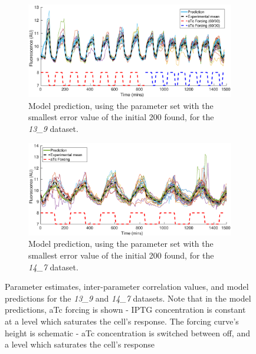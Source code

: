 \documentclass[10pt,journal]{./IEEE_latex_class/IEEEtran}
\begin{document}
\begin{figure}
    \begin{subfigure}[c]{0.49\textwidth}
    \centering
    \includegraphics[scale = 0.37]{13_9_bestPlot}
        \caption{Model prediction, using the parameter set with the smallest error value of the initial 200 found, for the \textit{13\_9} dataset.}
    \end{subfigure}
    \begin{subfigure}[c]{0.49\textwidth}
    \centering
        \includegraphics[scale = 0.37]{14_7_bestPlot}
        \caption{Model prediction, using the parameter set with the smallest error value of the initial 200 found, for the \textit{14\_7} dataset.}
    \end{subfigure}
    \caption{Parameter estimates, inter-parameter correlation values, and model predictions for the \textit{13\_9} and \textit{14\_7} datasets. Note that in the model predictions, aTc forcing is shown - IPTG concentration is constant at a level which saturates the cell's response. The forcing curve's height is schematic - aTc concentration is switched between off, and a level which saturates the cell's response }
\label{InitialResults}
\end{figure} 
 

\end{document}
